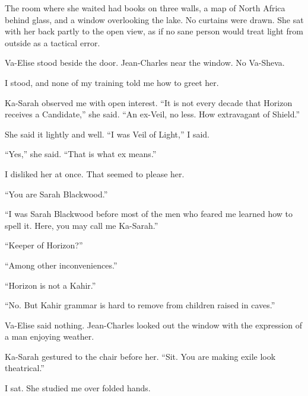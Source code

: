 The room where she waited had books on three walls, a map of North Africa behind glass, and a window overlooking the lake. No curtains were drawn. She sat with her back partly to the open view, as if no sane person would treat light from outside as a tactical error.\par

Va-Elise stood beside the door. Jean-Charles near the window. No Va-Sheva.\par

I stood, and none of my training told me how to greet her.\par

Ka-Sarah observed me with open interest. ``It is not every decade that Horizon receives a Candidate,'' she said. ``An ex-Veil, no less. How extravagant of Shield.''\par

She said it lightly and well. ``I was Veil of Light,'' I said.\par

``Yes,'' she said. ``That is what ex means.''\par

I disliked her at once. That seemed to please her.\par

``You are Sarah Blackwood.''\par

``I was Sarah Blackwood before most of the men who feared me learned how to spell it. Here, you may call me Ka-Sarah.''\par

``Keeper of Horizon?''\par

``Among other inconveniences.''\par

``Horizon is not a Kahir.''\par

``No. But Kahir grammar is hard to remove from children raised in caves.''\par

Va-Elise said nothing. Jean-Charles looked out the window with the expression of a man enjoying weather.\par

Ka-Sarah gestured to the chair before her. ``Sit. You are making exile look theatrical.''\par

I sat. She studied me over folded hands.\par

